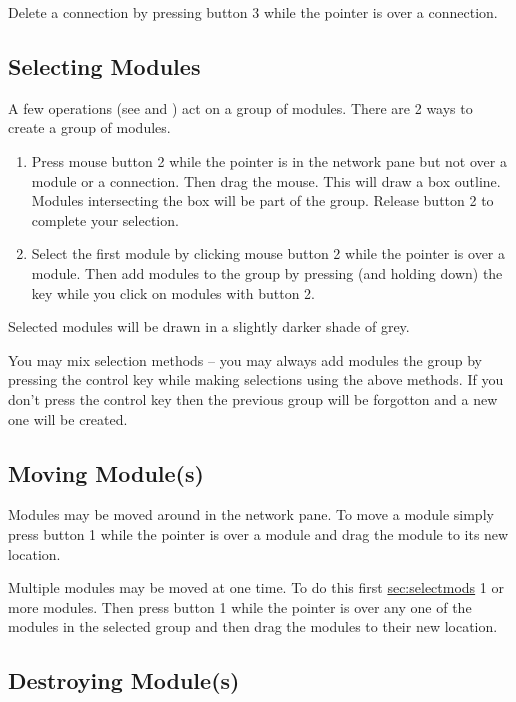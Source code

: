 Delete a connection by pressing button 3 while the pointer is
over a connection.

\subsection{Selecting Modules}
\label{sec:selectmods}

A few operations (see  and
) act on a group of
modules.  There are 2 ways to create a group of modules.

\begin{enumerate}
\item Press mouse button 2 while the pointer is in the network pane but not over
a module or a connection.  Then drag the mouse.  This will draw a box
outline.  Modules intersecting the box will be part of the group.  Release
button 2 to complete your selection.
\item Select the first module by clicking mouse button 2 while the pointer is
over a module.  Then add modules to the group by pressing (and holding
down) the  key while you click on modules with button 2.
\end{enumerate}

Selected modules will be drawn in a slightly darker shade of grey.

You may mix selection methods -- you may always add modules the group by
pressing the control key while making selections using the above methods.
If you don't press the control key then the previous group will be
forgotton and a new one will be created.

\subsection{Moving Module(s)}
\label{sec:movemod}

Modules may be moved around in the network pane.  To move a module simply
press button 1 while the pointer is over a module and drag the module to
its new location.

Multiple modules may be moved at one time.  To do this first
\hyperref{select}{select (see Section~}{)}{sec:selectmods} 1 or more
modules. Then press button 1 while the pointer is over any one of the
modules in the selected group and then drag the modules to their new location.


\subsection{Destroying Module(s)}
\label{sec:destroymod}

